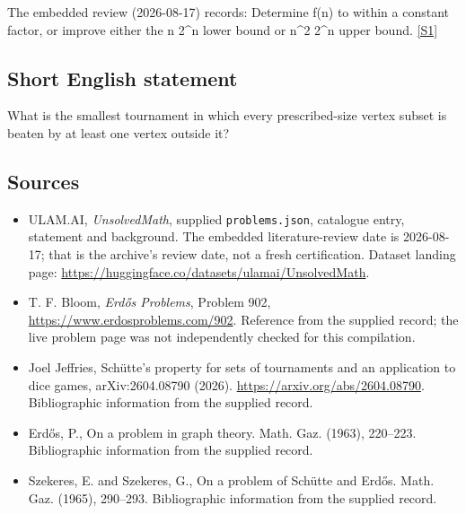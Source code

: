 \documentclass[11pt,a4paper]{article}
\newcommand{\sref}[2]{\hyperlink{source:#1:#2}{[S#2]}}
\begin{document}
The embedded review (2026-08-17) records: Determine f(n) to within a constant factor, or improve either the n 2\textasciicircum{}n lower bound or n\textasciicircum{}2 2\textasciicircum{}n upper bound. \sref{statement}{1}

\subsection{Short English statement}

What is the smallest tournament in which every prescribed-size vertex subset is beaten by at least one vertex outside it?

\subsection{Sources}

{\small

\begin{itemize}

\item[\hypertarget{source:statement:1}{S1}] ULAM.AI, \emph{UnsolvedMath}, supplied \texttt{problems.json}, catalogue entry, statement and background. The embedded literature-review date is 2026-08-17; that is the archive’s review date, not a fresh certification. Dataset landing page: \url{https://huggingface.co/datasets/ulamai/UnsolvedMath}.

\item[\hypertarget{source:statement:2}{S2}] T. F. Bloom, \emph{Erdős Problems}, Problem 902, \url{https://www.erdosproblems.com/902}. Reference from the supplied record; the live problem page was not independently checked for this compilation.

\item[\hypertarget{source:statement:3}{S3}] Joel Jeffries, Schütte's property for sets of tournaments and an application to dice games, arXiv:2604.08790 (2026). \url{https://arxiv.org/abs/2604.08790}. Bibliographic information from the supplied record.

\item[\hypertarget{source:statement:4}{S4}] Erd\H{o}s, P., On a problem in graph theory. Math. Gaz. (1963), 220--223. Bibliographic information from the supplied record.

\item[\hypertarget{source:statement:5}{S5}] Szekeres, E. and Szekeres, G., On a problem of {S}ch\"{u}tte and {E}rd\H{o}s. Math. Gaz. (1965), 290--293. Bibliographic information from the supplied record.

\end{itemize}

}

\label{end:statement}
\end{document}

